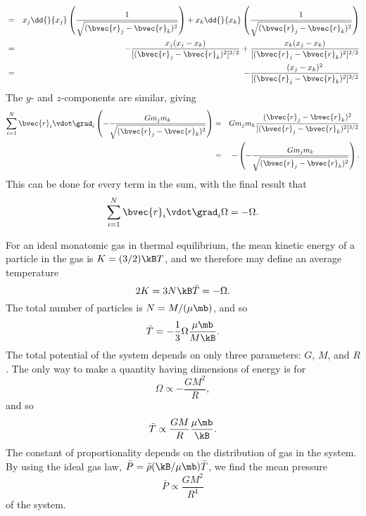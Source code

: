 \begin{sidebar}
\begin{eqnarray*}
	&=& x_{j}\dd{}{x_{j}}\left(\frac{1}{\sqrt{(\bvec{r}_{j}-\bvec{r}_{k})^{2}}}\right)
		+ x_{k}\dd{}{x_{k}}\left(\frac{1}{\sqrt{(\bvec{r}_{j}-\bvec{r}_{k})^{2}}}\right) \\
		&=& -\frac{x_{j}(x_{j}-x_{k})}{[(\bvec{r}_{j}-\bvec{r}_{k})^{2}]^{3/2}}
		+ \frac{x_{k}(x_{j}-x_{k})}{[(\bvec{r}_{j}-\bvec{r}_{k})^{2}]^{3/2}}\\
		&=& -\frac{(x_{j}-x_{k})^{2}}{[(\bvec{r}_{j}-\bvec{r}_{k})^{2}]^{3/2}}
\end{eqnarray*}
The $y$- and $z$-components are similar, giving
\begin{eqnarray*}
	\sum_{i=1}^{N}\bvec{r}_{i}\vdot\grad_{i}\left(-\frac{Gm_{j}m_{k}}{\sqrt{(\bvec{r}_{j}-\bvec{r}_{k})^{2}}}\right) &=& Gm_{j}m_{k}
	\frac{(\bvec{r}_{j}-\bvec{r}_{k})^{2}}{[(\bvec{r}_{j}-\bvec{r}_{k})^{2}]^{3/2}}\\
 &=& -\left(-\frac{Gm_{j}m_{k}}{\sqrt{(\bvec{r}_{j}-\bvec{r}_{k})^{2}}}\right).
\end{eqnarray*}
This can be done for every term in the sum, with the final result that
\[
	\sum_{i=1}^{N}\bvec{r}_{i}\vdot\grad_{i}\Omega = -\Omega.
\]
\end{sidebar}

For an ideal monatomic gas in thermal equilibrium, the mean kinetic energy of a particle in the gas is $K = (3/2)\kB T$, and we therefore may define an average temperature
\begin{equation}\label{e.Tbar}
	2 K = 3 N\kB \bar{T} = -\Omega.
\end{equation}
The total number of particles is $N=M/(\mu\mb)$, and so
\begin{equation}\label{e.mean-T}
\bar{T} = -\frac{1}{3}\Omega\frac{\mu\mb}{M\kB}.
\end{equation}
The total potential of the system depends on only three parameters: $G$, $M$, and $R$.  The only way to make a quantity having dimensions of energy is for
\[ \Omega \propto -\frac{GM^{2}}{R}, \]
and so
\[ \bar{T} \propto \frac{GM}{R}\frac{\mu\mb}{\kB}.  \]
The constant of proportionality depends on the distribution of gas in the system.
By using the ideal gas law, $\bar{P} = \bar{\rho}(\kB/\mu\mb)\bar{T}$, we find the mean pressure
\[ \bar{P} \propto \frac{GM^{2}}{R^{4}} \]
of the system.

